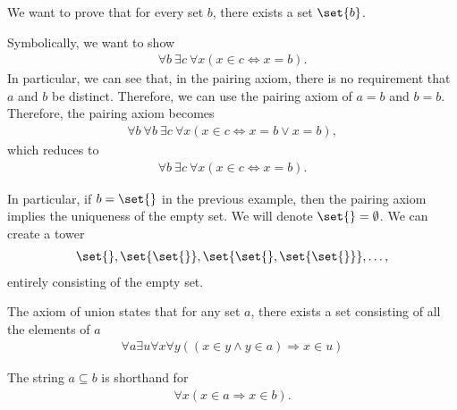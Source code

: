 \documentclass[10pt]{mypackage}
\begin{document}
\begin{example}
  We want to prove that for every set $b$, there exists a set $\set{b}$.\newline

  Symbolically, we want to show
  \begin{align*}
    \forall b\: \exists c\: \forall x \left(x\in c \Leftrightarrow x = b\right).
  \end{align*}
  In particular, we can see that, in the pairing axiom, there is no requirement that $a$ and $b$ be distinct. Therefore, we can use the pairing axiom of $a = b$ and $b = b$. Therefore, the pairing axiom becomes
  \begin{align*}
    \forall b\:\forall b\:\exists c\:\forall x\left(x\in c\Leftrightarrow x = b \vee x = b\right),
  \end{align*}
  which reduces to
  \begin{align*}
    \forall b\:\exists c\:\forall x\left(x\in c \Leftrightarrow x = b\right).
  \end{align*}
\end{example}
In particular, if $b = \set{}$ in the previous example, then the pairing axiom implies the uniqueness of the empty set. We will denote $\set{} = \emptyset$. We can create a tower
\begin{align*}
  \set{}, \set{\set{}}, \set{\set{},\set{\set{}}},\dots,
\end{align*}
entirely consisting of the empty set.
\begin{axiom}[Union]
  The axiom of union states that for any set $a$, there exists a set consisting of all the elements of $a$
  \begin{align*}
    \forall a \exists u \forall x \forall y \left(\left(x\in y \wedge y\in a\right)\Rightarrow x\in u\right)
  \end{align*}
\end{axiom}
\begin{definition}
  The string $a\subseteq b$ is shorthand for
  \begin{align*}
    \forall x \left(x\in a\Rightarrow x\in b\right).
  \end{align*}
\end{definition}
\end{document}
